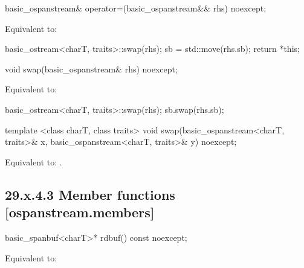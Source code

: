 \documentclass[ebook,11pt,article]{memoir}
\begin{document}
\begin{itemdecl}
basic_ospanstream& operator=(basic_ospanstream&& rhs) noexcept;
\end{itemdecl}

\begin{itemdescr}
\pnum
\effects Equivalent to: 
\begin{codeblock}
    basic_ostream<charT, traits>::swap(rhs);
    sb = std::move(rhs.sb);
    return *this;
\end{codeblock}
\end{itemdescr}

\begin{itemdecl}
void swap(basic_ospanstream& rhs) noexcept;
\end{itemdecl}

\begin{itemdescr}
\pnum
\effects Equivalent to:
\begin{codeblock}
    basic_ostream<charT, traits>::swap(rhs);
    sb.swap(rhs.sb);
\end{codeblock}
\end{itemdescr}


\begin{itemdecl}
template <class charT, class traits>
  void swap(basic_ospanstream<charT, traits>& x,
            basic_ospanstream<charT, traits>& y) noexcept;
\end{itemdecl}

\begin{itemdescr}
\pnum
\effects Equivalent to: .
\end{itemdescr}

\subsection{29.x.4.3 Member functions [ospanstream.members]}
\label{ospanstream.members}

\begin{itemdecl}
basic_spanbuf<charT>* rdbuf() const noexcept;
\end{itemdecl}

\begin{itemdescr}
\pnum
\effects Equivalent to: \\
\end{itemdescr}
\end{document}

